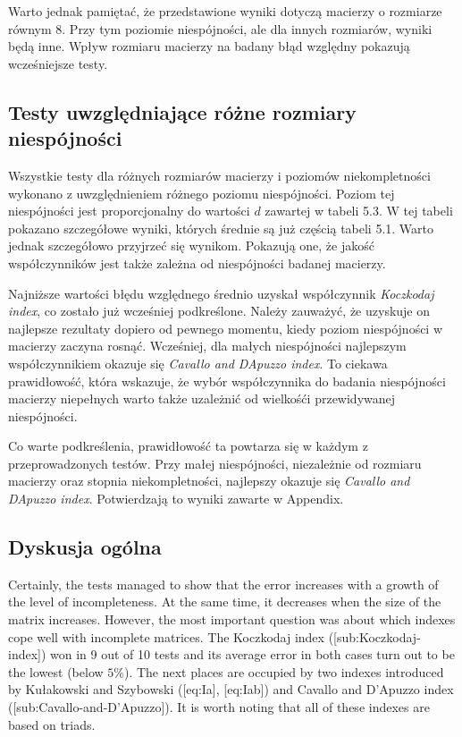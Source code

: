 Warto jednak pamiętać, że przedstawione wyniki dotyczą macierzy o rozmiarze równym 8. Przy tym poziomie niespójności, ale dla innych rozmiarów, wyniki będą inne. Wpływ rozmiaru macierzy na badany błąd względny pokazują wcześniejsze testy.

\subsection{Testy uwzględniające różne rozmiary niespójności}
Wszystkie testy dla różnych rozmiarów macierzy i poziomów niekompletności wykonano z uwzględnieniem różnego poziomu niespójności. Poziom tej niespójności jest proporcjonalny do wartości $d$ zawartej w tabeli 5.3. W tej tabeli pokazano szczegółowe wyniki, których średnie są już częścią tabeli 5.1. Warto jednak szczegółowo przyjrzeć się wynikom. Pokazują one, że jakość współczynników jest także zależna od niespójności badanej macierzy.

Najniższe wartości błędu względnego średnio uzyskał współczynnik \textit{Koczkodaj index}, co zostało już wcześniej podkreślone. Należy zauważyć, że uzyskuje on najlepsze rezultaty dopiero od pewnego momentu, kiedy poziom niespójności w macierzy zaczyna rosnąć. Wcześniej, dla małych niespójności najlepszym współczynnikiem okazuje się \textit{Cavallo and DApuzzo index}. To ciekawa prawidłowość, która wskazuje, że wybór współczynnika do badania niespójności macierzy niepełnych warto także uzależnić od wielkośći przewidywanej niespójności.

Co warte podkreślenia, prawidłowość ta powtarza się w każdym z przeprowadzonych testów. Przy małej niespójności, niezależnie od rozmiaru macierzy oraz stopnia niekompletności, najlepszy okazuje się \textit{Cavallo and DApuzzo index}. Potwierdzają to wyniki zawarte w Appendix.

\subsection{Dyskusja ogólna}
Certainly, the tests managed to show that the error increases with a growth of the level of incompleteness. At the same time, it decreases when the size of the matrix increases. However, the most important question was about which indexes cope well with incomplete matrices. The Koczkodaj index ([sub:Koczkodaj-index]) won in 9 out of 10 tests and its average error in both cases turn out to be the lowest (below $5\%$). The next places are occupied by two indexes introduced by Kułakowski and Szybowski ([eq:Ia], [eq:Iab]) and Cavallo and D'Apuzzo index ([sub:Cavallo-and-D’Apuzzo]). It is worth noting that all of these indexes are based on triads.

